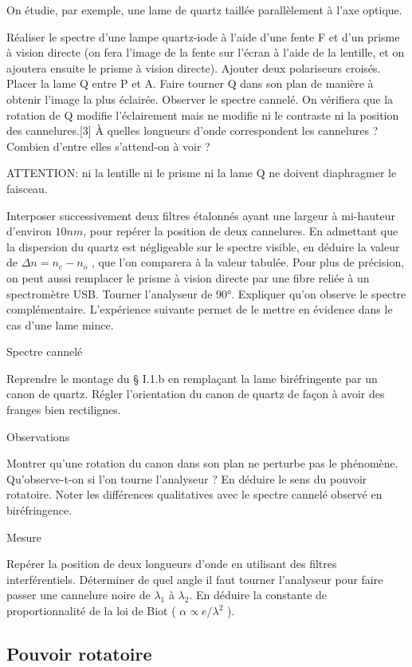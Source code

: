\documentclass{article}%
\begin{document}
On étudie, par exemple, une lame de quartz taillée parallèlement à l'axe optique.

    Réaliser le spectre d'une lampe quartz-iode à l'aide d'une fente F et d'un prisme à vision directe (on fera l'image de la fente sur l'écran à l'aide de la lentille, et on ajoutera ensuite le prisme à vision directe). Ajouter deux polariseurs croisés. Placer la lame Q entre P et A. Faire tourner Q dans son plan de manière à obtenir l'image la plus éclairée. Observer le spectre cannelé. On vérifiera que la rotation de Q modifie l'éclairement mais ne modifie ni le contraste ni la position des cannelures.[3] À quelles longueurs d'onde correspondent les cannelures ? Combien d'entre elles s'attend-on à voir ?

ATTENTION: ni la lentille ni le prisme ni la lame Q ne doivent diaphragmer le faisceau.

    Interposer successivement deux filtres étalonnés ayant une largeur à mi-hauteur d'environ $10 nm$, pour repérer la position de deux cannelures. En admettant que la dispersion du quartz est négligeable sur le spectre visible, en déduire la valeur de $\Delta n = n_e - n_o$ , que l'on comparera à la valeur tabulée. Pour plus de précision, on peut aussi remplacer le prisme à vision directe par une fibre reliée à un spectromètre USB.
    Tourner l'analyseur de 90°. Expliquer qu'on observe le spectre complémentaire. L'expérience suivante permet de le mettre en évidence dans le cas d'une lame mince.

Spectre cannelé

Reprendre le montage du § I.1.b en remplaçant la lame biréfringente par un canon de quartz. Régler l'orientation du canon de quartz de façon à avoir des franges bien rectilignes.

Observations

    Montrer qu'une rotation du canon dans son plan ne perturbe pas le phénomène.
    Qu'observe-t-on si l'on tourne l'analyseur ? En déduire le sens du pouvoir rotatoire.
    Noter les différences qualitatives avec le spectre cannelé observé en biréfringence.

Mesure

    Repérer la position de deux longueurs d'onde en utilisant des filtres interférentiels. Déterminer de quel angle il faut tourner l'analyseur pour faire passer une cannelure noire de $\lambda_{1}$ à $\lambda_{2}$.
    En déduire la constante de proportionnalité de la loi de Biot ( $\alpha \propto e/\lambda^{2}$ ).

\subsection{Pouvoir rotatoire}
\end{document}
